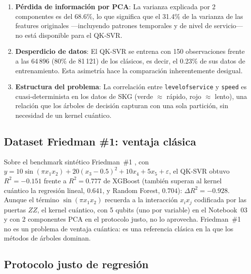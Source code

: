 \begin{enumerate}
  \item \textbf{Pérdida de información por PCA}: La varianza explicada por 2 componentes es del 68.6\%, lo que significa que el 31.4\% de la varianza de las features originales ---incluyendo patrones temporales y de nivel de servicio--- no está disponible para el QK-SVR.
  \item \textbf{Desperdicio de datos}: El QK-SVR se entrena con 150 observaciones frente a las 64\,896 (80\% de 81\,121) de los clásicos, es decir, el 0.23\% de sus datos de entrenamiento. Esta asimetría hace la comparación inherentemente desigual.
  \item \textbf{Estructura del problema}: La correlación entre \texttt{levelofservice} y \texttt{speed} es cuasi-determinista en los datos de SKG (verde $\approx$ rápido, rojo $\approx$ lento), una relación que los árboles de decisión capturan con una sola partición, sin necesidad de un kernel cuántico.
\end{enumerate}

\subsection{Dataset Friedman \#1: ventaja clásica}

Sobre el benchmark sintético Friedman~\#1 \citep{friedman1991}, con $y=10\sin(\pi x_1x_2)+20(x_3-0.5)^2+10x_4+5x_5+\varepsilon$, el QK-SVR obtuvo $R^2=-0.151$ frente a $R^2=0.777$ de XGBoost (también superan al kernel cuántico la regresión lineal, $0.641$, y Random Forest, $0.704$): $\Delta R^2=-0.928$. Aunque el término $\sin(\pi x_1x_2)$ recuerda a la interacción $x_ix_j$ codificada por las puertas $ZZ$, el kernel cuántico, con 5 qubits (uno por variable) en el Notebook~03 y con 2 componentes PCA en el protocolo justo, no lo aprovecha. Friedman~\#1 no es un problema de ventaja cuántica: es una referencia clásica en la que los métodos de árboles dominan.

\subsection{Protocolo justo de regresión}

